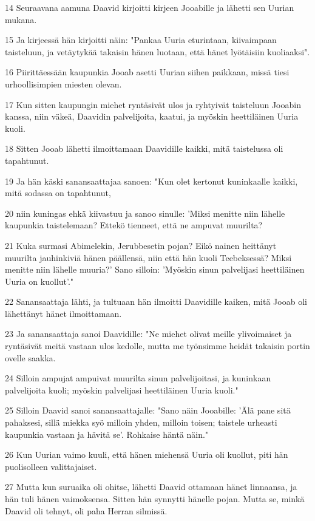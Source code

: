 \par 14 Seuraavana aamuna Daavid kirjoitti kirjeen Jooabille ja lähetti sen Uurian mukana.
\par 15 Ja kirjeessä hän kirjoitti näin: "Pankaa Uuria eturintaan, kiivaimpaan taisteluun, ja vetäytykää takaisin hänen luotaan, että hänet lyötäisiin kuoliaaksi".
\par 16 Piirittäessään kaupunkia Jooab asetti Uurian siihen paikkaan, missä tiesi urhoollisimpien miesten olevan.
\par 17 Kun sitten kaupungin miehet ryntäsivät ulos ja ryhtyivät taisteluun Jooabin kanssa, niin väkeä, Daavidin palvelijoita, kaatui, ja myöskin heettiläinen Uuria kuoli.
\par 18 Sitten Jooab lähetti ilmoittamaan Daavidille kaikki, mitä taistelussa oli tapahtunut.
\par 19 Ja hän käski sanansaattajaa sanoen: "Kun olet kertonut kuninkaalle kaikki, mitä sodassa on tapahtunut,
\par 20 niin kuningas ehkä kiivastuu ja sanoo sinulle: 'Miksi menitte niin lähelle kaupunkia taistelemaan? Ettekö tienneet, että ne ampuvat muurilta?
\par 21 Kuka surmasi Abimelekin, Jerubbesetin pojan? Eikö nainen heittänyt muurilta jauhinkiviä hänen päällensä, niin että hän kuoli Teebeksessä? Miksi menitte niin lähelle muuria?' Sano silloin: 'Myöskin sinun palvelijasi heettiläinen Uuria on kuollut'."
\par 22 Sanansaattaja lähti, ja tultuaan hän ilmoitti Daavidille kaiken, mitä Jooab oli lähettänyt hänet ilmoittamaan.
\par 23 Ja sanansaattaja sanoi Daavidille: "Ne miehet olivat meille ylivoimaiset ja ryntäsivät meitä vastaan ulos kedolle, mutta me työnsimme heidät takaisin portin ovelle saakka.
\par 24 Silloin ampujat ampuivat muurilta sinun palvelijoitasi, ja kuninkaan palvelijoita kuoli; myöskin palvelijasi heettiläinen Uuria kuoli."
\par 25 Silloin Daavid sanoi sanansaattajalle: "Sano näin Jooabille: 'Älä pane sitä pahaksesi, sillä miekka syö milloin yhden, milloin toisen; taistele urheasti kaupunkia vastaan ja hävitä se'. Rohkaise häntä näin."
\par 26 Kun Uurian vaimo kuuli, että hänen miehensä Uuria oli kuollut, piti hän puolisolleen valittajaiset.
\par 27 Mutta kun suruaika oli ohitse, lähetti Daavid ottamaan hänet linnaansa, ja hän tuli hänen vaimoksensa. Sitten hän synnytti hänelle pojan. Mutta se, minkä Daavid oli tehnyt, oli paha Herran silmissä.

